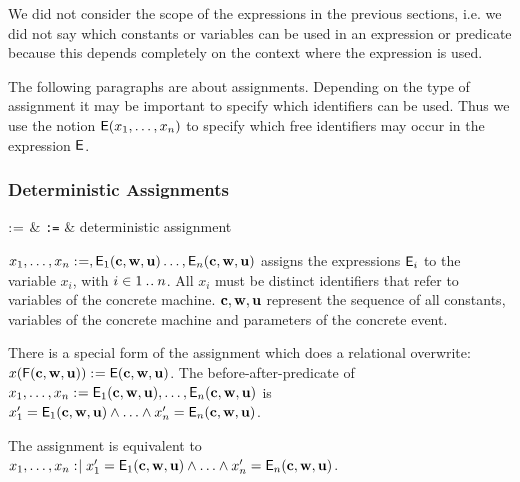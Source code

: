 We did not consider the scope of the expressions in the previous sections, i.e. we did not say which constants or variables can be used in an expression or predicate because
this depends completely on the context where the expression is used.

The following paragraphs are about assignments. Depending on the type of assignment it
may be important to specify which identifiers can be used.
Thus we use the notion $\textsf{E}(x_1,\ldots,x_n)$ to specify which free identifiers may occur
in the expression $\textsf{E}$.

\newcommand{\eventbassignmentexpr}[1]{\expre_{#1}(\allconstants,\concvariables,\concparameters)}

\begin{samepage}
\subsubsection{Deterministic Assignments}
\label{deterministic_assignments}
\begin{rrnames}
  $\mathrel{:\mkern1mu=}$ & \texttt{:=} & deterministic assignment
\end{rrnames}
\begin{rodinrefentry}
  \rrdesc
    $x_1,\ldots,x_n \bcmeq ,\eventbassignmentexpr{1}\ldots,\eventbassignmentexpr{n}$
    assigns the expressions $\textsf{E}_i$ to the variable $x_i$, with $i\in1\mathbin{.\mkern1mu.} n$.
    All $x_i$ must be distinct identifiers that refer to variables of the concrete machine.
    $\mathbf{c},\mathbf{w},\mathbf{u}$ represent the sequence of all constants, 
    variables of the concrete machine and parameters of the concrete event.

    There is a special form of the assignment which does a relational overwrite:\\
    $x(\textsf{F}(\mathbf{c},\mathbf{w},\mathbf{u})) \mathrel{:\mkern1mu=} \textsf{E}(\mathbf{c},\mathbf{w},\mathbf{u})$.
  \rrdef
    The before-after-predicate of $x_1,\ldots,x_n \bcmeq \eventbassignmentexpr{1},\ldots,\eventbassignmentexpr{n}$ is\\ $x_1' = \eventbassignmentexpr{1} \land \ldots \land x_n' = \eventbassignmentexpr{n}$.

    The assignment is equivalent to
    $x_1,\ldots,x_n \bcmsuch x_1' = \eventbassignmentexpr{1} \land \ldots \land x_n' = \eventbassignmentexpr{n}$.


\end{rodinrefentry}
\end{samepage}
